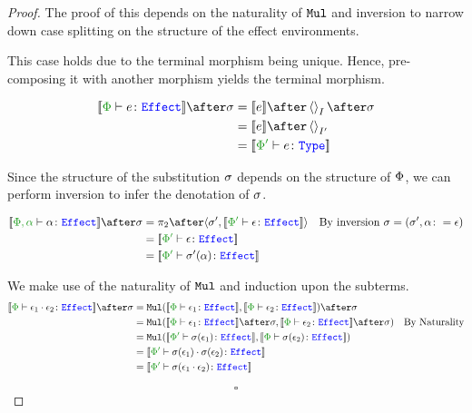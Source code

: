 \documentclass{Report}
\begin{document}
\begin{proof}
    The proof of this depends on the naturality of $\Mul$ and inversion to narrow down case splitting on the structure of the effect environments.

    This case holds due to the terminal morphism being unique. Hence, pre-composing it with another morphism yields the terminal morphism.

    \begin{align*}
        \deno{\typerelation{\P}{e}{\effect}}\after\si & = \deno{e}\after\term{I}\after\si \\
        & = \deno{e}\after\term{I'} \\
        & = \deno{\typerelation{\P'}{e}{\type}}\\
    \end{align*}


Since the structure of the substitution $\si$ depends on the structure of $\P$, we can perform inversion to infer the denotation of $\si$.

\begin{align*}
    \deno{\typerelation{\P,\a}{\a}{\effect}}\after\si &= \pp\after\pr{\si'}{\deno{\typerelation{\P'}{\e}{\effect}}}\qt{By inversion $\si = (\si', \a\setto\e)$}\\
    & =\deno{\typerelation{\P'}{\e}{\effect}} \\
    &= \deno{\typerelation{\P'}{\si'(\a)}{\effect}}\\
\end{align*}



We make use of the naturality of $\Mul$ and induction upon the subterms.
\begin{align*}
    \deno{\typerelation{\P}{\e_1\dot\e_2}{\effect}} \after\si &=
    \Mul(\deno{\typerelation{\P}{\e_1}{\effect}}, \deno{\typerelation{\P}{\e_2}{\effect}})\after \si \\
    & = \Mul(\deno{\typerelation{\P}{\e_1}{\effect}}\after \si, \deno{\typerelation{\P}{\e_2}{\effect}}\after \si)\qt{By Naturality}\\
    & = \Mul(\deno{\typerelation{\P'}{\si(\e_1)}{\effect}}, \deno{\typerelation{\P}{\si(\e_2)}{\effect}})\\
    & = \deno{\typerelation{\P'}{\si(\e_1)\dot\si(\e_2)}{\effect}}\\
    & = \deno{\typerelation{\P'}{\si(\e_1\dot\e_2)}{\effect}}\\
\end{align*}

$$\square$$
\end{proof}
\end{document}
